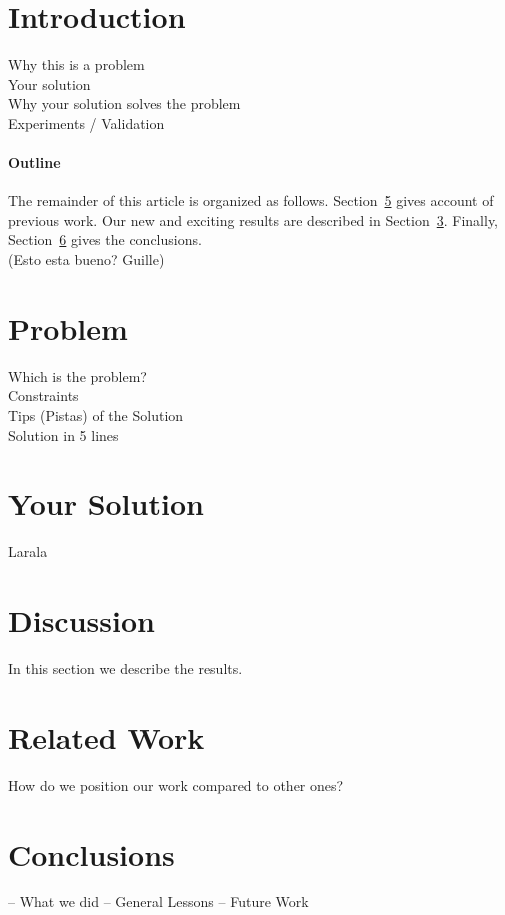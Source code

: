 \documentclass[a4paper, 10pt, english]{article}
\begin{document}
\begin{multicols}{2}

\section{Introduction}

Why this is a problem\\
Your solution\\
Why your solution solves the problem\\
Experiments / Validation\\

\paragraph{Outline}
The remainder of this article is organized as follows.\cite{Gil:02}
Section~\ref{related work} gives account of previous work.
Our new and exciting results are described in Section~\ref{your solution}.
Finally, Section~\ref{conclusions} gives the conclusions.\\
 (Esto esta bueno? Guille)

\section{Problem}\label{problem}
Which is the problem?\\
Constraints\\
Tips (Pistas) of the Solution\\
Solution in 5 lines\\

\section{Your Solution}\label{your solution}
Larala

\section{Discussion}\label{Discussion}
In this section we describe the results.

\section{Related Work}\label{related work}
How do we position our work compared to other ones?

\section{Conclusions}\label{conclusions}
– What we did
– General Lessons
– Future Work




\end{multicols}
\end{document}
